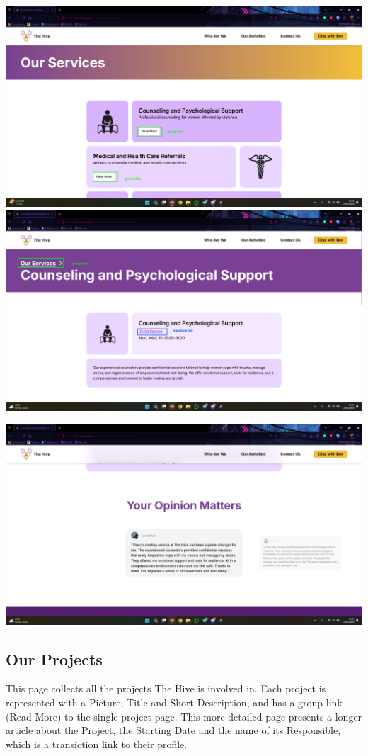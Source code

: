 \vspace{1em}
\includegraphics[width=0.5\linewidth]{img/design-document/website-screenshots/servicespage.png}
\includegraphics[width=0.5\linewidth]{img/design-document/website-screenshots/servicepage-1.png}
\begin{center}
    \includegraphics[width=0.5\linewidth]{img/design-document/website-screenshots/servicepage-2.png}   
\end{center}

\subsection{Our Projects}
This page collects all the projects The Hive is involved in. Each project is represented with a Picture, Title and Short Description,
and has a group link (Read More) to the single project page. This more detailed page presents a longer article about the Project, the Starting Date and 
the name of its Responsible, which is a transiction link to their profile.

